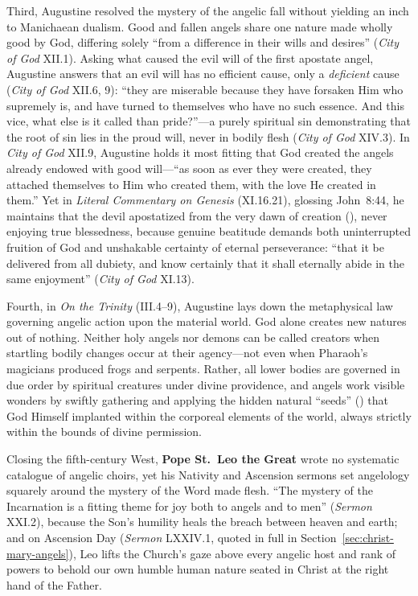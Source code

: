 Third, Augustine resolved the mystery of the angelic fall without yielding an inch to Manichaean dualism. Good and fallen angels share one nature made wholly good by God, differing solely ``from a difference in their wills and desires'' (\emph{City of God} XII.1). Asking what caused the evil will of the first apostate angel, Augustine answers that an evil will has no efficient cause, only a \emph{deficient} cause (\emph{City of God} XII.6, 9): ``they are miserable because they have forsaken Him who supremely is, and have turned to themselves who have no such essence. And this vice, what else is it called than pride?''---a purely spiritual sin demonstrating that the root of sin lies in the proud will, never in bodily flesh (\emph{City of God} XIV.3). In \emph{City of God} XII.9, Augustine holds it most fitting that God created the angels already endowed with good will---``as soon as ever they were created, they attached themselves to Him who created them, with the love He created in them.'' Yet in \emph{Literal Commentary on Genesis} (XI.16.21), glossing John~8:44, he maintains that the devil apostatized from the very dawn of creation (), never enjoying true blessedness, because genuine beatitude demands both uninterrupted fruition of God and unshakable certainty of eternal perseverance: ``that it be delivered from all dubiety, and know certainly that it shall eternally abide in the same enjoyment'' (\emph{City of God} XI.13).

Fourth, in \emph{On the Trinity} (III.4--9), Augustine lays down the metaphysical law governing angelic action upon the material world. God alone creates new natures out of nothing. Neither holy angels nor demons can be called creators when startling bodily changes occur at their agency---not even when Pharaoh's magicians produced frogs and serpents. Rather, all lower bodies are governed in due order by spiritual creatures under divine providence, and angels work visible wonders by swiftly gathering and applying the hidden natural ``seeds'' () that God Himself implanted within the corporeal elements of the world, always strictly within the bounds of divine permission.

Closing the fifth-century West, \textbf{Pope St.~Leo the Great} wrote no systematic catalogue of angelic choirs, yet his Nativity and Ascension sermons set angelology squarely around the mystery of the Word made flesh. ``The mystery of the Incarnation is a fitting theme for joy both to angels and to men'' (\emph{Sermon} XXI.2), because the Son's humility heals the breach between heaven and earth; and on Ascension Day (\emph{Sermon} LXXIV.1, quoted in full in Section~\ref{sec:christ-mary-angels}), Leo lifts the Church's gaze above every angelic host and rank of powers to behold our own humble human nature seated in Christ at the right hand of the Father.

